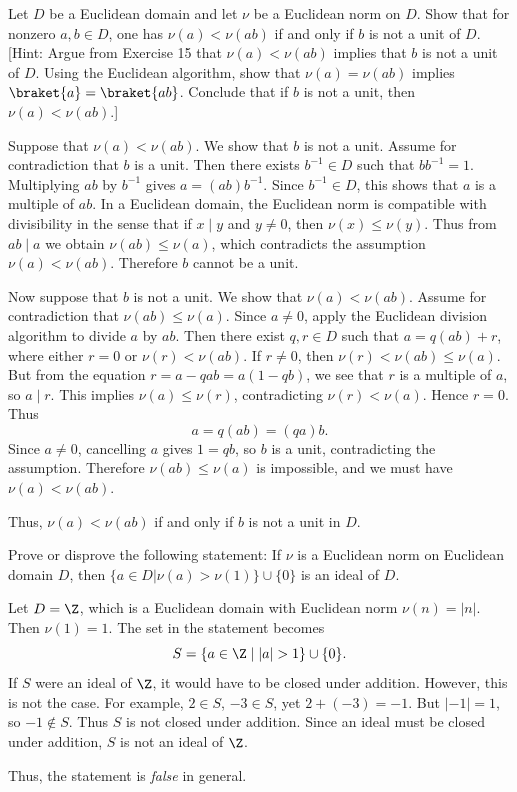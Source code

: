 \begin{problem}[35.16]
  Let $D$ be a Euclidean domain and let $\nu$ be a Euclidean norm on $D$. Show that for nonzero $a, b \in D$, one has $\nu(a) < \nu(ab)$ if and only if $b$ is not a unit of $D$. [Hint: Argue from Exercise 15 that $\nu(a) < \nu(ab)$ implies that $b$ is not a unit of $D$. Using the Euclidean algorithm, show that $\nu(a) = \nu(ab)$ implies $\braket{a} = \braket{ab}$. Conclude that if $b$ is not a unit, then $\nu(a) < \nu(ab)$.]
\end{problem}

\begin{solution}
  Suppose that $\nu(a) < \nu(ab)$. We show that $b$ is not a unit. Assume for contradiction that $b$ is a unit. Then there exists $b^{-1} \in D$ such that $bb^{-1} = 1$. Multiplying $ab$ by $b^{-1}$ gives $a = (ab)b^{-1}$. Since $b^{-1} \in D$, this shows that $a$ is a multiple of $ab$. In a Euclidean domain, the Euclidean norm is compatible with divisibility in the sense that if $x \mid y$ and $y \neq 0$, then $\nu(x) \le \nu(y)$. Thus from $ab \mid a$ we obtain $\nu(ab) \le \nu(a)$, which contradicts the assumption $\nu(a) < \nu(ab)$. Therefore $b$ cannot be a unit.

  Now suppose that $b$ is not a unit. We show that $\nu(a) < \nu(ab)$. Assume for contradiction that $\nu(ab) \le \nu(a)$. Since $a \neq 0$, apply the Euclidean division algorithm to divide $a$ by $ab$. Then there exist $q,r \in D$ such that $a = q(ab) + r$, where either $r = 0$ or $\nu(r) < \nu(ab)$. If $r \neq 0$, then $\nu(r) < \nu(ab) \le \nu(a)$. But from the equation $r = a - qab = a(1 - qb)$, we see that $r$ is a multiple of $a$, so $a \mid r$. This implies $\nu(a) \le \nu(r)$, contradicting $\nu(r) < \nu(a)$. Hence $r=0$. Thus
  \[%
    a = q(ab) = (qa)b
  .\]%
  Since $a \neq 0$, cancelling $a$ gives $1 = qb$, so $b$ is a unit, contradicting the assumption. Therefore $\nu(ab) \le \nu(a)$ is impossible, and we must have $\nu(a) < \nu(ab)$.

  Thus, $\nu(a) < \nu(ab)$ if and only if $b$ is not a unit in $D$.
\end{solution}

\begin{problem}[35.17]
  Prove or disprove the following statement: If $\nu$ is a Euclidean norm on Euclidean domain $D$, then $\{a \in D | \nu(a) > \nu(1)\} \cup \{0\}$ is an ideal of $D$.
\end{problem}

\begin{solution}
  Let $D = \Z$, which is a Euclidean domain with Euclidean norm $\nu(n) = |n|$. Then $\nu(1) = 1$. The set in the statement becomes
  \[%
    S = \{a \in \Z \mid |a| > 1\} \cup \{0\}
  .\]%
  If $S$ were an ideal of $\Z$, it would have to be closed under addition. However, this is not the case. For example, $2 \in S$, $-3 \in S$, yet $2 + (-3) = -1$. But $|-1| = 1$, so $-1 \notin S$. Thus $S$ is not closed under addition. Since an ideal must be closed under addition, $S$ is not an ideal of $\Z$.

  Thus, the statement is \emph{false} in general.
\end{solution}

